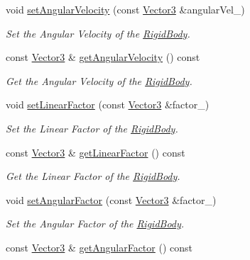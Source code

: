 \begin{DoxyCompactItemize}
void \hyperlink{class_magnum_1_1_physics3_1_1_rigid_body_a1dd87fc98e3abb8f0f51a459b47e32e8}{set\+Angular\+Velocity} (const \hyperlink{class_magnum_1_1_vector3}{Vector3} \&angular\+Vel\+\_\+)
\begin{DoxyCompactList}\small\item\em Set the Angular Velocity of the \hyperlink{class_magnum_1_1_physics3_1_1_rigid_body}{Rigid\+Body}. \end{DoxyCompactList}\item 
const \hyperlink{class_magnum_1_1_vector3}{Vector3} \& \hyperlink{class_magnum_1_1_physics3_1_1_rigid_body_a18fb8fe77d47702ba76e3bc53d886ab9}{get\+Angular\+Velocity} () const 
\begin{DoxyCompactList}\small\item\em Get the Angular Velocity of the \hyperlink{class_magnum_1_1_physics3_1_1_rigid_body}{Rigid\+Body}. \end{DoxyCompactList}\item 
void \hyperlink{class_magnum_1_1_physics3_1_1_rigid_body_ab10f62f9a8043afbc52eb3250b8a9ea9}{set\+Linear\+Factor} (const \hyperlink{class_magnum_1_1_vector3}{Vector3} \&factor\+\_\+)
\begin{DoxyCompactList}\small\item\em Set the Linear Factor of the \hyperlink{class_magnum_1_1_physics3_1_1_rigid_body}{Rigid\+Body}. \end{DoxyCompactList}\item 
const \hyperlink{class_magnum_1_1_vector3}{Vector3} \& \hyperlink{class_magnum_1_1_physics3_1_1_rigid_body_a6bbf3d47156ec0e4891ed66df91b78c5}{get\+Linear\+Factor} () const 
\begin{DoxyCompactList}\small\item\em Get the Linear Factor of the \hyperlink{class_magnum_1_1_physics3_1_1_rigid_body}{Rigid\+Body}. \end{DoxyCompactList}\item 
void \hyperlink{class_magnum_1_1_physics3_1_1_rigid_body_a1a46b0f42049edca3a2b1ac4ba31e89b}{set\+Angular\+Factor} (const \hyperlink{class_magnum_1_1_vector3}{Vector3} \&factor\+\_\+)
\begin{DoxyCompactList}\small\item\em Set the Angular Factor of the \hyperlink{class_magnum_1_1_physics3_1_1_rigid_body}{Rigid\+Body}. \end{DoxyCompactList}\item 
const \hyperlink{class_magnum_1_1_vector3}{Vector3} \& \hyperlink{class_magnum_1_1_physics3_1_1_rigid_body_a0d4484ceee782e1d56a2b9f6c96ff6d8}{get\+Angular\+Factor} () const 

\end{DoxyCompactItemize}
